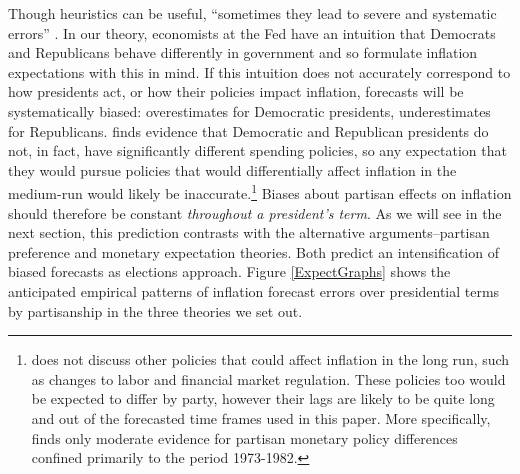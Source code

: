 \documentclass[a4paper]{article}
\begin{document}
Though heuristics can be useful, ``sometimes they lead to severe and systematic errors'' \citep[][1124]{tverskykahneman1974}. In our theory, economists at the Fed have an intuition that Democrats and Republicans behave differently in government and so formulate inflation expectations with this in mind. If this intuition does not accurately correspond to how presidents act, or how their policies impact inflation, forecasts will be systematically biased: overestimates for Democratic presidents, underestimates for Republicans. \cite{Bartels2008} finds evidence that Democratic and Republican presidents do not, in fact, have significantly different spending policies, so any expectation that they would pursue policies that would differentially affect inflation in the medium-run would likely be inaccurate.\footnote{\cite{Bartels2008} does not discuss other policies that could affect inflation in the long run, such as changes to labor and financial market regulation. These policies too would be expected to differ by party, however their lags are likely to be quite long and out of the forecasted time frames used in this paper. More specifically, \cite{Franzese2002} finds only moderate evidence for partisan monetary policy differences confined primarily to the period 1973-1982.} Biases about partisan effects on inflation should therefore be constant {\emph{throughout a president's term}}. As we will see in the next section, this prediction contrasts with the alternative arguments--partisan preference and monetary expectation theories. Both predict an intensification of biased forecasts as elections approach. Figure \ref{ExpectGraphs} shows the anticipated empirical patterns of inflation forecast errors over presidential terms by partisanship in the three theories we set out.
\end{document}
